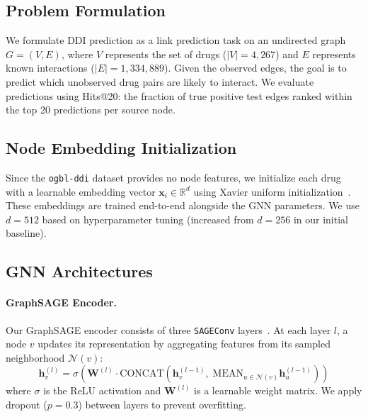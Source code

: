 \documentclass{article}
\begin{document}
\subsection{Problem Formulation}

We formulate DDI prediction as a link prediction task on an undirected graph $G = (V, E)$, where $V$ represents the set of drugs ($|V| = 4{,}267$) and $E$ represents known interactions ($|E| = 1{,}334{,}889$). Given the observed edges, the goal is to predict which unobserved drug pairs are likely to interact. We evaluate predictions using Hits@20: the fraction of true positive test edges ranked within the top 20 predictions per source node.

\subsection{Node Embedding Initialization}

Since the \texttt{ogbl-ddi} dataset provides no node features, we initialize each drug with a learnable embedding vector $\mathbf{x}_i \in \mathbb{R}^d$ using Xavier uniform initialization~\citep{glorot2010understanding}. These embeddings are trained end-to-end alongside the GNN parameters. We use $d = 512$ based on hyperparameter tuning (increased from $d = 256$ in our initial baseline).

\subsection{GNN Architectures}

\paragraph{GraphSAGE Encoder.}
Our GraphSAGE encoder consists of three \texttt{SAGEConv} layers~\citep{hamilton2017inductive}. At each layer $l$, a node $v$ updates its representation by aggregating features from its sampled neighborhood $\mathcal{N}(v)$:
\begin{equation}
    \mathbf{h}_v^{(l)} = \sigma\left(\mathbf{W}^{(l)} \cdot \text{CONCAT}\left(\mathbf{h}_v^{(l-1)},\; \text{MEAN}_{u \in \mathcal{N}(v)} \mathbf{h}_u^{(l-1)}\right)\right)
\end{equation}
where $\sigma$ is the ReLU activation and $\mathbf{W}^{(l)}$ is a learnable weight matrix. We apply dropout ($p = 0.3$) between layers to prevent overfitting.
\end{document}
